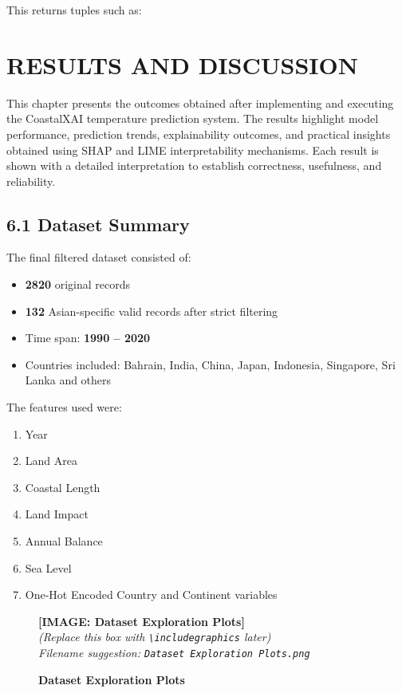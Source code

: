 \documentclass[12pt, a4paper]{article}
\newcommand{\imageplaceholder}[2]{
  \begin{figure}[H]
    \centering
    \begin{tcolorbox}[colback=white, colframe=black, width=0.8\textwidth, arc=0mm, boxrule=1pt]
      \centering
      \vspace{#2}
      \textbf{\Large [IMAGE: #1]}\\
      \vspace{0.5cm}
      \textit{(Replace this box with \texttt{\textbackslash includegraphics} later)}\\
      \textit{Filename suggestion: \texttt{#1.png}}
      \vspace{#2}
    \end{tcolorbox}
    \caption{\textbf{#1}}
    \label{fig:#1}
  \end{figure}
}
\begin{document}
This returns tuples such as:

\newpage
\section{\textbf{RESULTS AND DISCUSSION}}

This chapter presents the outcomes obtained after implementing and executing the CoastalXAI temperature prediction system. The results highlight model performance, prediction trends, explainability outcomes, and practical insights obtained using SHAP and LIME interpretability mechanisms. Each result is shown with a detailed interpretation to establish correctness, usefulness, and reliability.


\subsection{\textbf{6.1 Dataset Summary}}

The final filtered dataset consisted of:

\begin{itemize}
    \item \textbf{2820} original records
    \item \textbf{132} Asian-specific valid records after strict filtering
    \item Time span: \textbf{1990 – 2020}
    \item Countries included: Bahrain, India, China, Japan, Indonesia, Singapore, Sri Lanka and others
\end{itemize}

The features used were:

\begin{enumerate}
    \item Year
    \item Land Area
    \item Coastal Length
    \item Land Impact
    \item Annual Balance
    \item Sea Level
    \item One-Hot Encoded Country and Continent variables
\end{enumerate}

\imageplaceholder{Dataset Exploration Plots}{6cm}
\end{document}
